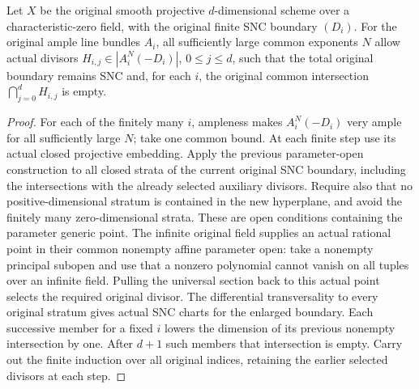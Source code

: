 \begin{theorem}
\label{thm:kn-nadel-bertini-auxiliary-divisors}
Let $X$ be the original smooth projective $d$-dimensional scheme over a
characteristic-zero field, with the original finite
SNC boundary $(D_i)$. For the original ample line bundles $A_i$, all
sufficiently large common exponents $N$ allow actual divisors
$H_{i,j}\in|A_i^N(-D_i)|$, $0\le j\le d$, such that the total original
boundary remains SNC and, for each $i$, the original common intersection
$\bigcap_{j=0}^d H_{i,j}$ is empty.
\end{theorem}
\begin{proof}
For each of the finitely many $i$, ampleness makes $A_i^N(-D_i)$ very
ample for all sufficiently large $N$; take one common bound. At each
finite step use its actual closed projective embedding. Apply the previous
parameter-open construction to all closed strata of the current original
SNC boundary, including the intersections with the already selected
auxiliary divisors. Require also that no positive-dimensional stratum is
contained in the new hyperplane, and avoid the finitely many
zero-dimensional strata. These are open conditions containing the
parameter generic point. The infinite original field supplies an actual rational point in their
common nonempty affine parameter open: take a nonempty principal subopen
and use that a nonzero polynomial cannot vanish on all tuples over an
infinite field. Pulling the
universal section back to this actual point selects the required original
divisor. The differential transversality to every original stratum gives
actual SNC charts for the enlarged boundary. Each successive member for a
fixed $i$ lowers the dimension of its previous nonempty intersection by
one. After $d+1$ such members that intersection is empty. Carry out the
finite induction over all original indices, retaining the earlier selected
divisors at each step.
\end{proof}
